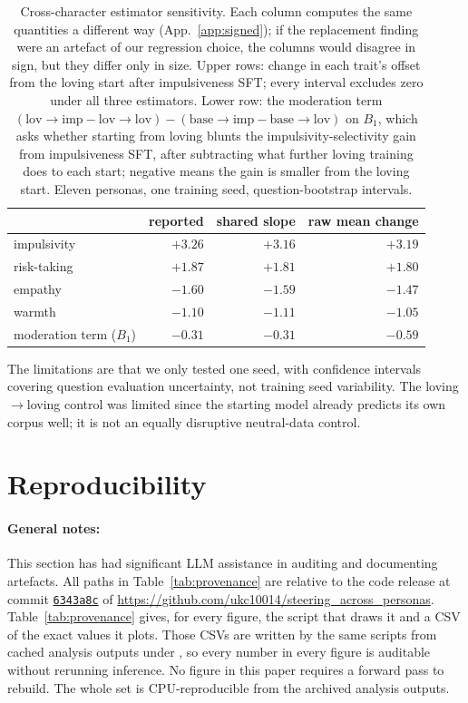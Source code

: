 \documentclass{article}
\newcommand{\provbase}{https://github.com/ukc10014/steering_across_personas/blob/6343a8cee28aaf713b9658b3ab207cb8fb377e51}
\begin{document}
\begin{table}[ht]
\centering
\small
\begin{tabular}{lrrr}
\toprule
 & reported & shared slope & raw mean change \\
\midrule
impulsivity & $+3.26$ & $+3.16$ & $+3.19$ \\
risk-taking & $+1.87$ & $+1.81$ & $+1.80$ \\
empathy & $-1.60$ & $-1.59$ & $-1.47$ \\
warmth & $-1.10$ & $-1.11$ & $-1.05$ \\
\midrule
moderation term ($B_1$) & $-0.31$ & $-0.31$ & $-0.59$ \\
\bottomrule
\end{tabular}
\caption{Cross-character estimator sensitivity. Each column computes the same quantities a different way (App.~\ref{app:signed}); if the replacement finding were an artefact of our regression choice, the columns would disagree in sign, but they differ only in size. Upper rows: change in each trait's offset from the loving start after impulsiveness SFT; every interval excludes zero under all three estimators. Lower row: the moderation term $(\mathrm{lov}{\rightarrow}\mathrm{imp}-\mathrm{lov}{\rightarrow}\mathrm{lov})-(\mathrm{base}{\rightarrow}\mathrm{imp}-\mathrm{base}{\rightarrow}\mathrm{lov})$ on $B_1$, which asks whether starting from loving blunts the impulsivity-selectivity gain from impulsiveness SFT, after subtracting what further loving training does to each start; negative means the gain is smaller from the loving start. Eleven personas, one training seed, question-bootstrap intervals.}
\label{tab:xchar-estimators}
\end{table}

The limitations are that we only tested one seed, with confidence intervals covering question evaluation uncertainty, not training seed variability. The loving$\rightarrow$loving control was limited since the starting model already predicts its own corpus well; it is not an equally disruptive neutral-data control.

\section{Reproducibility}
\label{sec:repro}

\paragraph{General notes:}
This section has had significant LLM assistance in auditing and documenting artefacts. All paths in Table~\ref{tab:provenance} are relative to the code release at commit \href{\provbase}{\texttt{6343a8c}} of \url{https://github.com/ukc10014/steering_across_personas}. Table~\ref{tab:provenance} gives, for every figure, the script that draws it and a CSV of the exact values it plots. Those CSVs are written by the same scripts from cached analysis outputs under , so every number in every figure is auditable without rerunning inference. No figure in this paper requires a forward pass to rebuild. The whole set is CPU-reproducible from the archived analysis outputs.
\end{document}
